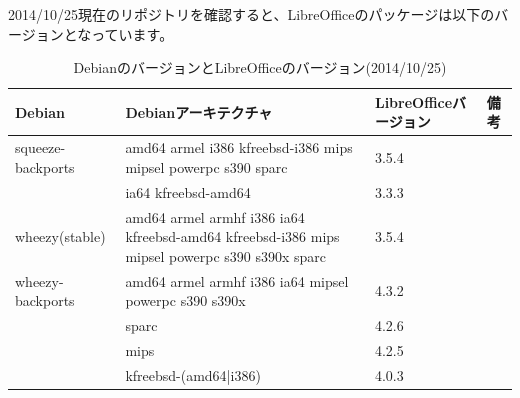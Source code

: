 \documentclass[mingoth,a4paper]{jsarticle}
\begin{document}
 2014/10/25現在のリポジトリを確認すると、LibreOfficeのパッケージは以下のバージョンとなっています。

\begin{table}[ht]
\begin{center}
\small
\begin{tabular}{|l|p{7cm}|l|l|}
\hline 
Debian&Debianアーキテクチャ&LibreOfficeバージョン& 備考\\ \hline \hline
squeeze-backports & amd64 armel i386 kfreebsd-i386 mips mipsel powerpc s390 sparc & 3.5.4 & \\ \cline{2-4}
 & ia64 kfreebsd-amd64 & 3.3.3 & \\ \hline
wheezy(stable) & amd64 armel armhf i386 ia64 kfreebsd-amd64 kfreebsd-i386 mips mipsel powerpc s390 s390x sparc & 3.5.4 & \\ \hline
wheezy-backports & amd64 armel armhf i386 ia64 mipsel powerpc s390 s390x & 4.3.2 & \\ \cline{2-4}
 & sparc & 4.2.6 & \\ \cline{2-4}
 & mips & 4.2.5  & \\ \cline{2-4}
 & kfreebsd-(amd64|i386)& 4.0.3 & \\ \hline
\end{tabular}
\end{center}
\caption{DebianのバージョンとLibreOfficeのバージョン(2014/10/25)}
\label{tab:debian-vs-libreoffice-version}
\end{table}
\end{document}
